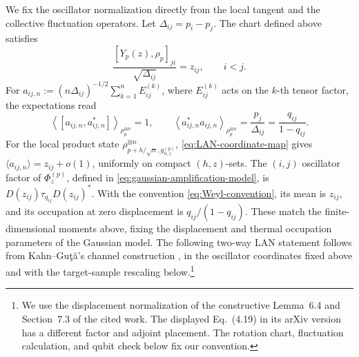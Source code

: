 \documentclass[11pt]{article}
\theoremstyle{remark}
\theoremstyle{plain}
\newcommand{\ot}{\otimes}
\begin{document}
We fix the oscillator normalization directly from the local tangent and
the collective fluctuation operators.  Let \(\Delta_{ij}=p_i-p_j\).  The
chart defined above satisfies
\begin{equation}\label{eq:LAN-coordinate-map}
  \frac{[Y_p(z),\rho_p]_{ji}}{\sqrt{\Delta_{ij}}}=z_{ij},
  \qquad i<j.
\end{equation}
For \(a_{ij,n}:=(n\Delta_{ij})^{-1/2}\sum_{k=1}^n E_{ij}^{(k)}\), where
\(E_{ij}^{(k)}\) acts on the \(k\)-th tensor factor, the expectations read
\[
  \left\langle[a_{ij,n},a_{ij,n}^*]\right\rangle_{\rho_p^{\ot n}}=1,
  \qquad
  \left\langle a_{ij,n}^*a_{ij,n}\right\rangle_{\rho_p^{\ot n}}
  =\frac{p_j}{\Delta_{ij}}=\frac{q_{ij}}{1-q_{ij}}.
\]
For the local product state
\(\rho_{p+h/\sqrt n,g_{n,z}^{(p)}}^{\ot n}\),
\eqref{eq:LAN-coordinate-map} gives
\(\langle a_{ij,n}\rangle=z_{ij}+o(1)\), uniformly on compact
\((h,z)\)-sets.  The \((i,j)\) oscillator factor of \(\Phi_z^{(p)}\),
defined in \eqref{eq:gaussian-amplification-model}, is
\(D(z_{ij})\tau_{q_{ij}}D(z_{ij})^*\).  With the convention
\eqref{eq:Weyl-convention}, its mean is \(z_{ij}\), and its occupation
at zero displacement is \(q_{ij}/(1-q_{ij})\).  These match the
finite-dimensional moments above, fixing the displacement and thermal
occupation parameters of the Gaussian model.
The following two-way LAN statement follows from Kahn--Gu\c{t}\u{a}'s
channel construction \cite[Theorem~4.3, Lemma~6.4, and
Section~7.3]{KahnGuta2009LANFiniteDimensional}, in the oscillator
coordinates fixed above and with the target-sample rescaling below.\footnote{We
use the displacement normalization of the constructive Lemma~6.4 and
Section~7.3 of the cited work.  The displayed Eq.~(4.19) in its arXiv
version has a different factor and adjoint placement.  The rotation chart,
fluctuation calculation, and qubit check below fix our convention.}
\end{document}
